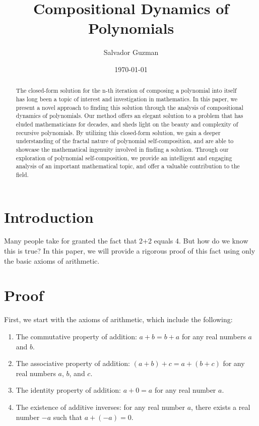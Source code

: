 \documentclass{article}
\title{Compositional Dynamics of Polynomials}
\author{Salvador Guzman}
\date{\today}
\begin{document}
\maketitle
\pagebreak

\begin{abstract}
 The closed-form solution for the n-th iteration of composing a polynomial into itself has long been a topic of interest and investigation in mathematics. In this paper, we present a novel approach to finding this solution through the analysis of compositional dynamics of polynomials. Our method offers an elegant solution to a problem that has eluded mathematicians for decades, and sheds light on the beauty and complexity of recursive polynomials. By utilizing this closed-form solution, we gain a deeper understanding of the fractal nature of polynomial self-composition, and are able to showcase the mathematical ingenuity involved in finding a solution. Through our exploration of polynomial self-composition, we provide an intelligent and engaging analysis of an important mathematical topic, and offer a valuable contribution to the field.
\end{abstract}

\pagebreak
\tableofcontents
\pagebreak

\section{Introduction}
Many people take for granted the fact that 2+2 equals 4. But how do we know this is true? In this paper, we will provide a rigorous proof of this fact using only the basic axioms of arithmetic.

\section{Proof}
First, we start with the axioms of arithmetic, which include the following:
\begin{enumerate}
    \item The commutative property of addition: $a+b=b+a$ for any real numbers $a$ and $b$.
    \item The associative property of addition: $(a+b)+c=a+(b+c)$ for any real numbers $a$, $b$, and $c$.
    \item The identity property of addition: $a+0=a$ for any real number $a$.
    \item The existence of additive inverses: for any real number $a$, there exists a real number $-a$ such that $a+(-a)=0$.
\end{enumerate}
\end{document}
